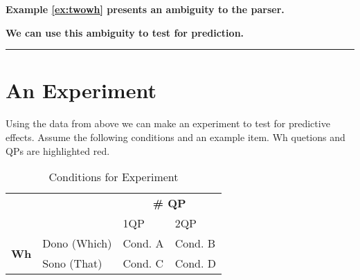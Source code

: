 \documentclass[12pt]{article}
\def\blank{\medskip\hrule\medskip}
\begin{document}
\begin{center}
    \textbf{Example \ref{ex:twowh} presents an ambiguity to the parser.}
\end{center}
\vspace{0.2cm}

\vspace{0.2cm}
\begin{center}
    \textbf{We can use this ambiguity to test for prediction.}
\end{center}

\blank
\newpage
\section{An Experiment}
Using the data from above we can make an experiment to test for predictive effects.
Assume the following conditions and an example item. Wh quetions and QPs are highlighted red.

\begin{table}[H]
    \centering
    \begin{tabular}{cl|ll|}
    \cline{3-4}
    \multicolumn{1}{l}{}                               &      & \multicolumn{2}{c|}{\textbf{\# QP}} \\ \cline{3-4} 
    \textbf{}                                          &      & \multicolumn{1}{l|}{1QP}   & 2QP  \\ \hline
    \multicolumn{1}{|c|}{\multirow{2}{*}{\textbf{Wh}}} & Dono (Which)   & \multicolumn{1}{l|}{Cond. A }    & Cond. B    \\ \cline{2-4} 
    \multicolumn{1}{|c|}{}                             & Sono (That) & \multicolumn{1}{l|}{Cond. C}    & Cond. D    \\ \hline
    \end{tabular}
    \caption{Conditions for Experiment}
    \label{table:exp2}
\end{table}
\end{document}
